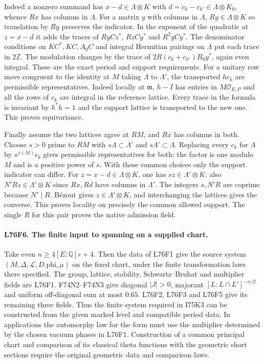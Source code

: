 Indeed a nonzero summand has $x-d\in\Lambda\otimes K$ with
$d=c_k-c_{k'}\in\Lambda\otimes K_0$, whence $Rx$ has columns
in $\Lambda$. For a matrix $y$ with columns in $\Lambda$,
$Ry\in\Lambda\otimes K$ so translation by $Ry$ preserves the
indicator. In the exponent of the quadratic at $z=x-d$ it adds
the traces of $RyCz^*$, $RzCy^*$ and $R^2yCy^*$. The denominator
conditions on $KC^*,KC,A_0C$ and integral Hermitian pairings on
$\Lambda$ put each trace in $2\mathbb Z$. The modulation changes
by the trace of $2R(c_k+c_{k'})B_0y^*$, again even integral.
These are the exact period and support requirements. For a unitary
row move congruent to the identity at $M$ taking $\Lambda$ to
$\Lambda'$, the transported $hc_k$ are permissible representatives.
Indeed locally at $\mathfrak m$, $h-I$ has entries in
$M\mathcal O_{E,P}$ and all the rows of $c_k$ are integral in
the reference lattice. Every trace in the formula is invariant by
$h^*h=1$ and the support lattice is transported to the new one.
This proves equivariance.

Finally assume the two lattices agree at $RM$, and $Rx$ has
columns in both. Choose $s>0$ prime to $RM$ with
$s\Lambda\subset\Lambda'$ and $s\Lambda'\subset\Lambda$.
Replacing every $c_k$ for $\Lambda$ by
$s^{\varphi(M)}c_k$ gives permissible representatives for both:
the factor is one modulo $M$ and is a positive power of $s$.
With these common choices only the support indicator can differ.
For $z=x-d\in\Lambda\otimes K$, one has
$sz\in\Lambda'\otimes K$; also
$N'Rz\in\Lambda'\otimes K$ since $Rx,Rd$ have columns in
$\Lambda'$. The integers $s,N'R$ are coprime because $N'\mid R$.
B\'ezout gives $z\in\Lambda'\otimes K$, and interchanging the
lattices gives the converse. This proves locality on precisely
the common allowed support. The single $R$ for this pair proves
the native admission field.

\paragraph{L76F6. The finite input to spanning on a supplied chart.}
Take even $n\ge4[E:\mathbb Q]r+4$. Then the data of L76F1
give the source system
$(M,\Delta,\mathcal L,D.\mathrm{phi},\mu)$ on the fixed chart,
under the finite transformation laws there specified. The group,
lattice, stability, Schwartz--Bruhat and multiplier fields are
L76F1. F74N2--F74N3 give diagonal $|J|>0$, majorant
$[L:L\cap L']^{-n/2}$ and uniform off-diagonal sum at most
$0.65$. L76F2, L76F3 and L76F5 give its remaining three fields.
Thus the finite system required in I75K3 can be constructed from
the given marked level and compatible period data. In applications
the automorphy law for the form must use the multiplier determined
by the chosen vacuum phases in L76F1. Construction of a common
principal chart and comparison of its classical theta functions
with the geometric short sections require the original geometric
data and comparison laws.
